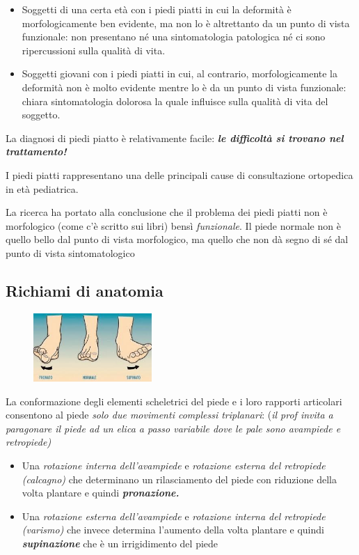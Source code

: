\begin{itemize}
\item
  Soggetti di una certa età con i piedi piatti in cui la deformità è morfologicamente ben evidente, ma non lo è altrettanto da un punto di vista funzionale: non presentano né una sintomatologia patologica né ci sono ripercussioni sulla qualità di vita.
\item
  Soggetti giovani con i piedi piatti in cui, al contrario, morfologicamente la deformità non è molto evidente mentre lo è da un punto di vista funzionale: chiara sintomatologia dolorosa la quale influisce sulla qualità di vita del soggetto.
\end{itemize}

La diagnosi di piedi piatto è relativamente facile: \textbf{\emph{le difficoltà si trovano nel trattamento!}}

I piedi piatti rappresentano una delle principali cause di consultazione ortopedica in età pediatrica.

La ricerca ha portato alla conclusione che il problema dei piedi piatti non è morfologico (come c'è scritto sui libri) bensì \emph{funzionale}.
Il piede normale non è quello bello dal punto di vista morfologico, ma quello che non dà segno di sé dal punto di vista sintomatologico

\subsection{Richiami di anatomia}

\begin{figure}[!ht]
\centering
\includegraphics[width=0.4\textwidth]{014/image2.png}
\end{figure}

La conformazione degli elementi scheletrici del piede e i loro rapporti articolari consentono al piede \emph{solo due movimenti complessi triplanari}: (\emph{il prof invita a paragonare il piede ad un elica a passo variabile dove le pale sono avampiede e retropiede)}

\begin{itemize}
\item
  Una \emph{rotazione interna dell'avampiede} e \emph{rotazione esterna del retropiede (calcagno)} che determinano un rilasciamento del piede con riduzione della volta plantare e quindi \textbf{\emph{pronazione.}}
\item
  Una \emph{rotazione esterna dell'avampiede} e \emph{rotazione interna del retropiede (varismo)} che invece determina l'aumento della volta plantare e quindi \textbf{\emph{supinazione}} che è un irrigidimento del piede
\end{itemize}

